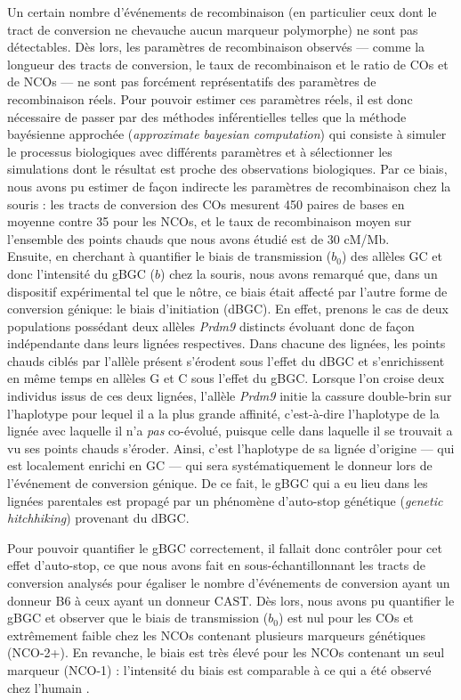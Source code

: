 {Un certain nombre d'événements de recombinaison (en particulier ceux dont le tract de conversion ne chevauche aucun marqueur polymorphe) ne sont pas détectables.
Dès lors, les paramètres de recombinaison observés — comme la longueur des tracts de conversion, le taux de recombinaison et le ratio de COs et de NCOs — ne sont pas forcément représentatifs des paramètres de recombinaison réels.
Pour pouvoir estimer ces paramètres réels, il est donc nécessaire de passer par des méthodes inférentielles telles que la méthode bayésienne approchée (\textit{approximate bayesian computation}) qui consiste à simuler le processus biologiques avec différents paramètres et à sélectionner les simulations dont le résultat est proche des observations biologiques.
Par ce biais, nous avons pu estimer de façon indirecte les paramètres de recombinaison chez la souris : les tracts de conversion des COs mesurent 450 paires de bases en moyenne contre 35 pour les NCOs, et le taux de recombinaison moyen sur l'ensemble des points chauds que nous avons étudié est de 30 cM/Mb.\\


Ensuite, en cherchant à quantifier le biais de transmission ($b_0$) des allèles GC et donc l'intensité du gBGC ($b$) chez la souris, nous avons remarqué que, dans un dispositif expérimental tel que le nôtre, ce biais était affecté par l'autre forme de conversion génique: le biais d'initiation (dBGC).
En effet, prenons le cas de deux populations possédant deux allèles \textit{Prdm9} distincts évoluant donc de façon indépendante dans leurs lignées respectives.
Dans chacune des lignées, les points chauds ciblés par l'allèle présent s'érodent sous l'effet du dBGC et s'enrichissent en même temps en allèles G et C sous l'effet du gBGC\@.
Lorsque l'on croise deux individus issus de ces deux lignées, l'allèle \textit{Prdm9} initie la cassure double-brin sur l'haplotype pour lequel il a la plus grande affinité, c'est-à-dire l'haplotype de la lignée avec laquelle il n'a \textit{pas} co-évolué, puisque celle dans laquelle il se trouvait a vu ses points chauds s'éroder.
Ainsi, c'est l'haplotype de sa lignée d'origine — qui est localement enrichi en GC — qui sera systématiquement le donneur lors de l'événement de conversion génique.
De ce fait, le gBGC qui a eu lieu dans les lignées parentales est propagé par un phénomène d’auto-stop génétique (\textit{genetic hitchhiking}) provenant du dBGC\@.

Pour pouvoir quantifier le gBGC correctement, il fallait donc contrôler pour cet effet d'auto-stop, ce que nous avons fait en sous-échantillonnant les tracts de conversion analysés pour égaliser le nombre d'événements de conversion ayant un donneur B6 à ceux ayant un donneur CAST\@.
Dès lors, nous avons pu quantifier le gBGC et observer que le biais de transmission ($b_0$) est nul pour les COs et extrêmement faible chez les NCOs contenant plusieurs marqueurs génétiques (NCO-2+). 
En revanche, le biais est très élevé pour les NCOs contenant un seul marqueur (NCO-1) : l'intensité du biais est comparable à ce qui a été observé chez l'humain \citep{halldorsson2016rate}.\\

}
